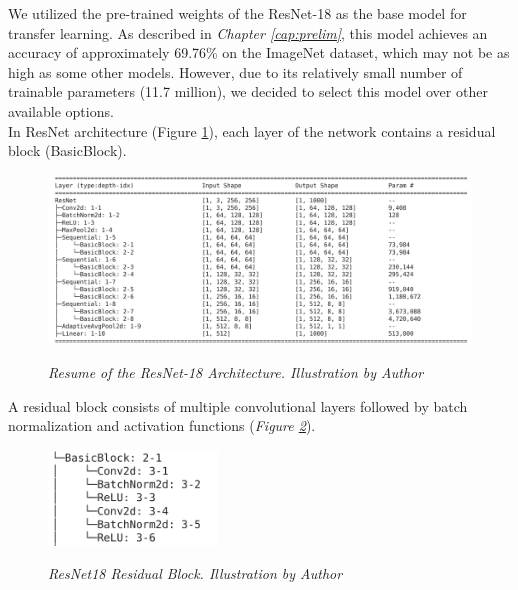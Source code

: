 We utilized the pre-trained weights of the ResNet-18 as the base model
for transfer learning. As described in \textit{Chapter \ref{cap:prelim}}, this
model achieves an accuracy of approximately 69.76\% on the ImageNet
dataset, which may not be as high as some other models. However, due to its
relatively small number of trainable parameters (11.7 million), we decided to
select this model over other available options. \\

In ResNet architecture (Figure \ref{fig:resnet-18-arch}), each layer of the
network contains a residual block (BasicBlock).

\begin{figure}[H]
  \begin{adjustbox}{width=\textwidth, trim={0.2cm 0pt 1.5cm 0pt}, clip}
    \centering
    \includegraphics[width=\textwidth]{imatges/methodological_contribution/residual-blocks.png}
  \end{adjustbox}
  \caption[Resume of the ResNet-18 Architecture]{\textit{Resume of the
  ResNet-18 Architecture. Illustration by Author}}
  {\label{fig:resnet-18-arch}}
\end{figure}

A residual block consists of multiple convolutional layers followed by batch
normalization and activation functions (\textit{Figure
\ref{fig:resnet-18-residual-block}}).

\begin{figure}[H]
  \centering
  \includegraphics[width=0.4\textwidth]{imatges/methodological_contribution/basic-block.png}
  \caption[ResNet18 Residual Block]{\textit{ResNet18 Residual Block. Illustration by Author}}
  {\label{fig:resnet-18-residual-block}}
\end{figure}

